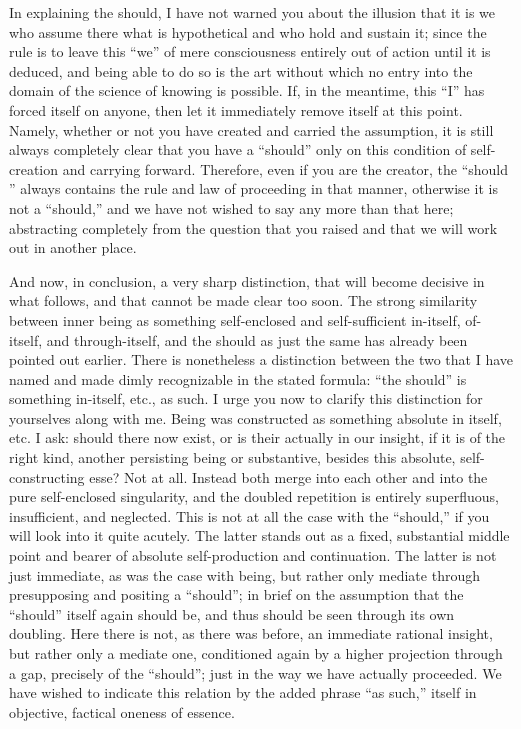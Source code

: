 In explaining the should, I have not warned you
about the illusion that it is we who assume there
what is hypothetical and who hold and sustain it;
since the rule is to leave this “we”
of mere consciousness entirely out of action until it is deduced,
and being able to do so is the art without which
no entry into the domain of the science of knowing is possible.
If, in the meantime, this “I” has forced itself on anyone,
then let it immediately remove itself at this point.
Namely, whether or not you have created and carried the assumption,
it is still always completely clear that you have a “should”
only on this condition of self-creation and carrying forward.
Therefore, even if you are the creator,
the “should ” always contains the rule and law
of proceeding in that manner,
otherwise it is not a “should,”
and we have not wished to say any more than that here;
abstracting completely from the question that you raised
and that we will work out in another place.

And now, in conclusion, a very sharp distinction,
that will become decisive in what follows,
and that cannot be made clear too soon.
The strong similarity between inner being
as something self-enclosed and self-sufficient
in-itself, of-itself, and through-itself,
and the should as just the same
has already been pointed out earlier.
There is nonetheless a distinction
between the two that I have named
and made dimly recognizable in the stated formula:
“the should” is something in-itself, etc., as such.
I urge you now to clarify this distinction
for yourselves along with me.
Being was constructed as something absolute in itself, etc.
I ask: should there now exist,
or is their actually in our insight,
if it is of the right kind,
another persisting being or substantive,
besides this absolute, self-constructing esse?
Not at all.
Instead both merge into each other
and into the pure self-enclosed singularity,
and the doubled repetition is entirely
superfluous, insufficient, and neglected.
This is not at all the case with the “should,”
if you will look into it quite acutely.
The latter stands out as a fixed, substantial
middle point and bearer of
absolute self-production and continuation.
The latter is not just immediate,
as was the case with being,
but rather only mediate through
presupposing and positing a “should”;
in brief on the assumption that
the “should” itself again should be,
and thus should be seen through its own doubling.
Here there is not, as there was before,
an immediate rational insight,
but rather only a mediate one,
conditioned again by a higher
projection through a gap,
precisely of the “should”;
just in the way we have actually proceeded.
We have wished to indicate this relation
by the added phrase “as such,”
itself in objective, factical oneness of essence.

